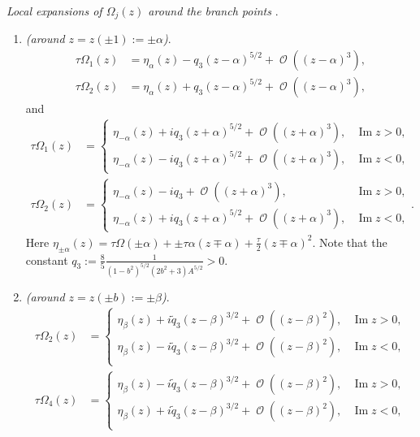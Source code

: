 \documentclass[10pt,a4paper]{amsart}
\DeclareMathOperator{\OO}{\mathcal{O}}
\numberwithin{equation}{section}
\begin{document}
\begin{prop}\label{local-expansions-high-temp}
\textit{ Local expansions of $\Omega_j(z)$ around the branch points }.
 \begin{enumerate}\itemsep=0pt
 \item \textit{(around $z= z(\pm 1) := \pm\alpha$)}.
 \begin{align}
 \tau\Omega_1(z) &= \eta_\alpha(z) - q_3 (z-\alpha)^{5/2} +\OO( (z-\alpha)^{3} ),\\
 \tau\Omega_2(z) &= \eta_\alpha(z) + q_3 (z-\alpha)^{5/2} +\OO( (z-\alpha)^{3} ),
 \end{align}
 and
 \begin{align}
 \tau\Omega_1(z) &= \begin{cases}
 \eta_{-\alpha}(z) + iq_3 (z+\alpha)^{5/2} +\OO( (z+\alpha)^{3} ), & \operatorname{Im} z >0,\\
 \eta_{-\alpha}(z) - i q_3 (z+\alpha)^{5/2} +\OO( (z+\alpha)^{3} ), & \operatorname{Im} z <0,
 \end{cases} \\
 \tau\Omega_2(z) &=
 \begin{cases}
 \eta_{-\alpha}(z) - i q_3 +\OO( (z+\alpha)^{3} ), & \operatorname{Im} z >0,\\
 \eta_{-\alpha}(z) + i q_3 (z+\alpha)^{5/2} +\OO( (z+\alpha)^{3} ), & \operatorname{Im} z <0,
 \end{cases} .
 \end{align}
 Here $\eta_{\pm \alpha}(z) = \tau \Omega(\pm \alpha) + \pm\tau \alpha (z\mp\alpha) + \frac{\tau}{2}(z\mp \alpha)^2$. Note that the constant
 $q_3 := \frac{8}{5}\frac{1}{(1-b^2)^{5/2}(2b^2+3)A^{5/2}} >0$.
 \item \textit{(around $z= z( \pm b) := \pm \beta$)}.
 \begin{align}
 \tau\Omega_2(z) &=
 \begin{cases}
 \eta_{\beta}(z) + i\tilde{q}_3 (z -\beta)^{3/2} + \OO( (z-\beta)^2 ), & \operatorname{Im} z > 0,\\
 \eta_{\beta}(z) - i\tilde{q}_3 (z -\beta)^{3/2} + \OO( (z-\beta)^2 ),& \operatorname{Im} z < 0,\\
 \end{cases}\\
 \tau\Omega_4(z) &=
 \begin{cases}
 \eta_{\beta}(z) - i\tilde{q}_3 (z -\beta)^{3/2} + \OO( (z-\beta)^2 ), & \operatorname{Im} z > 0,\\
 \eta_{\beta}(z) + i\tilde{q}_3 (z -\beta)^{3/2} + \OO( (z-\beta)^2 ),& \operatorname{Im} z < 0,\\

\end{cases}
\end{align}
\end{enumerate}
\end{prop}
\end{document}
